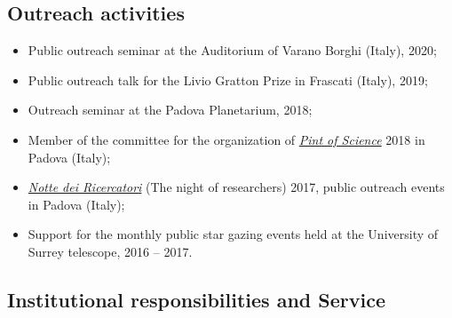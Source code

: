 \subsection*{Outreach activities}

\begin{itemize}

    \item Public outreach seminar at the Auditorium of Varano Borghi (Italy), 2020;
    
    \item  Public outreach talk for the Livio Gratton Prize  in Frascati (Italy), 2019;%

    \item Outreach seminar at the Padova Planetarium, 2018;%

    \item Member of the committee for the organization of \href{https://pintofscience.com/}{\it Pint of Science} 2018 in Padova (Italy);
    
    \item \href{http://www.venetonight.it/}{\it Notte dei Ricercatori} (The night of researchers) 2017, public outreach events in Padova  (Italy);
    
    
    \item Support for the monthly public star gazing events held at the University of Surrey telescope, 2016 -- 2017.

\end{itemize}



\subsection*{Institutional responsibilities and Service}

